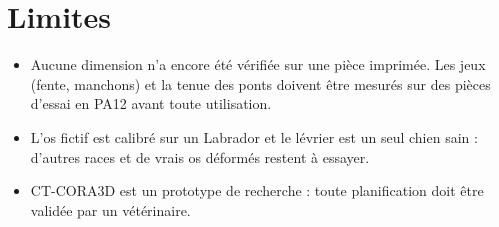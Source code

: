 \documentclass[11pt,a4paper]{article}
\begin{document}
\section{Limites}

\begin{itemize}
  \item Aucune dimension n'a encore été vérifiée sur une pièce imprimée. Les jeux (fente, manchons) et la tenue des
        ponts doivent être mesurés sur des pièces d'essai en PA12 avant toute utilisation.
  \item L'os fictif est calibré sur un Labrador et le lévrier est un seul chien sain : d'autres races et de vrais os
        déformés restent à essayer.
  \item CT-CORA3D est un prototype de recherche : toute planification doit être validée par un vétérinaire.
\end{itemize}
\end{document}
